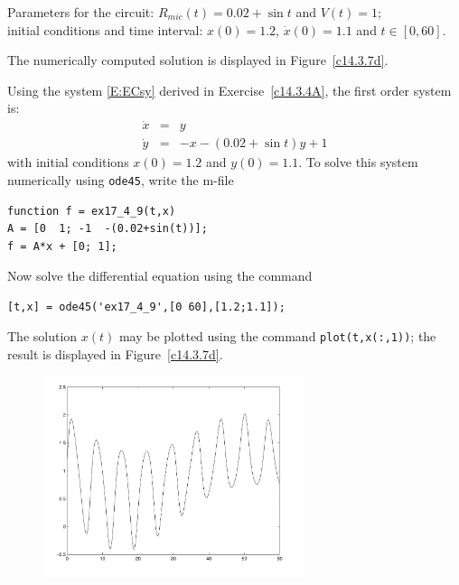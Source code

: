 \documentclass{ximera}
\begin{document}
\begin{computerExercise} \label{c14.3.7d}
Parameters for the circuit: $R_{mic}(t) = 0.02+\sin t$ and $V(t) = 1$;\\
initial conditions and time interval: $x(0) = 1.2$, $\dot{x}(0) = 1.1$ and 
$t\in[0,60]$.

\begin{solution}
\ans The numerically computed solution is displayed in 
Figure~\ref{c14.3.7d}.

\soln  Using the system \eqref{E:ECsy} derived in 
Exercise~\ref{c14.3.4A}, the first order system is:
\begin{eqnarray*}
\dot{x} & = & y \\
\dot{y} & = & -x - (0.02+\sin t)y + 1
\end{eqnarray*}
with initial conditions $x(0)=1.2$ and $y(0)=1.1$.   To solve this system numerically 
using {\tt ode45}, write the m-file
\begin{verbatim}
function f = ex17_4_9(t,x)
A = [0  1; -1  -(0.02+sin(t))];
f = A*x + [0; 1];
\end{verbatim}
Now solve the differential equation using the command
\begin{verbatim}
[t,x] = ode45('ex17_4_9',[0 60],[1.2;1.1]);
\end{verbatim}
The solution $x(t)$ may be plotted using the command {\tt plot(t,x(:,1))}; the 
result is displayed in Figure~\ref{c14.3.7d}.
\begin{figure}[htb]
     \centerline{%
     \includegraphics[width=3.0in]{exfigure/fig17-4-9.pdf}}
\end{figure} 





\end{solution}
\end{computerExercise}
\end{document}
